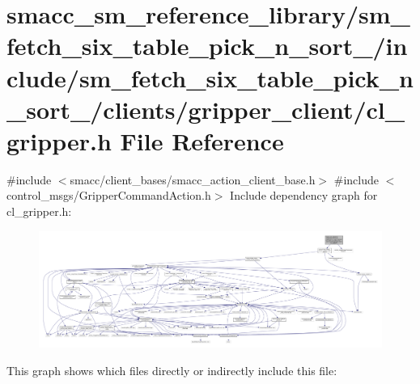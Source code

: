 \hypertarget{sm__fetch__six__table__pick__n__sort__1_2include_2sm__fetch__six__table__pick__n__sort__1_2clienf1b29855fe4f6938a9d6a5ca1e0b8e9a}{}\section{smacc\+\_\+sm\+\_\+reference\+\_\+library/sm\+\_\+fetch\+\_\+six\+\_\+table\+\_\+pick\+\_\+n\+\_\+sort\+\_/include/sm\+\_\+fetch\+\_\+six\+\_\+table\+\_\+pick\+\_\+n\+\_\+sort\+\_/clients/gripper\+\_\+client/cl\+\_\+gripper.h File Reference}
\label{sm__fetch__six__table__pick__n__sort__1_2include_2sm__fetch__six__table__pick__n__sort__1_2clienf1b29855fe4f6938a9d6a5ca1e0b8e9a}
{\ttfamily \#include $<$smacc/client\+\_\+bases/smacc\+\_\+action\+\_\+client\+\_\+base.\+h$>$}\newline
{\ttfamily \#include $<$control\+\_\+msgs/\+Gripper\+Command\+Action.\+h$>$}\newline
Include dependency graph for cl\+\_\+gripper.\+h\+:
\nopagebreak
\begin{figure}[H]
\begin{center}
\leavevmode
\includegraphics[width=350pt]{sm__fetch__six__table__pick__n__sort__1_2include_2sm__fetch__six__table__pick__n__sort__1_2cliene4b1dffc29cd8e767086e975d5817e54}
\end{center}
\end{figure}
This graph shows which files directly or indirectly include this file\+:
\nopagebreak
